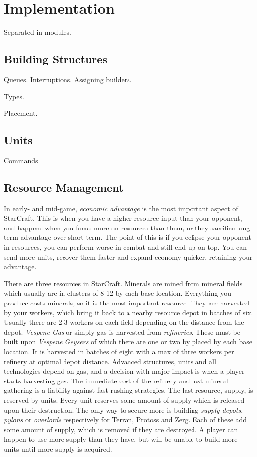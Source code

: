 \chapter{Implementation}

Separated in modules.

\section{Building Structures}

Queues. Interruptions. Assigning builders.

Types.

Placement.

\section{Units}

Commands

\section{Resource Management}

In early- and mid-game, \emph{economic advantage} is the most important aspect of StarCraft. This is when you have a higher resource input than your opponent, and happens when you focus more on resources than them, or they sacrifice long term advantage over short term. The point of this is if you eclipse your opponent in resources, you can perform worse in combat and still end up on top. You can send more units, recover them faster and expand economy quicker, retaining your advantage.

There are three resources in StarCraft. Minerals are mined from mineral fields which usually are in clusters of 8-12 by each base location. Everything you produce costs minerals, so it is the most important resource. They are harvested by your workers, which bring it back to a nearby resource depot in batches of six. Usually there are 2-3 workers on each field depending on the distance from the depot. \emph{Vespene Gas} or simply gas is harvested from \emph{refineries}. These must be built upon \emph{Vespene Geysers} of which there are one or two by placed by each base location. It is harvested in batches of eight with a max of three workers per refinery at optimal depot distance. Advanced structures, units and all technologies depend on gas, and a decision with major impact is when a player starts harvesting gas. The immediate cost of the refinery and lost mineral gathering is a liability against fast rushing strategies. The last resource, supply, is reserved by units. Every unit reserves some amount of supply which is released upon their destruction. The only way to secure more is building \emph{supply depots}, \emph{pylons} or \emph{overlords} respectively for Terran, Protoss and Zerg. Each of these add some amount of supply, which is removed if they are destroyed. A player can happen to use more supply than they have, but will be unable to build more units until more supply is acquired.

